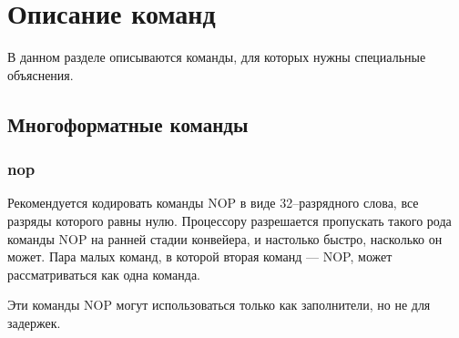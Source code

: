 \documentclass[forwardcom.tex]{subfiles}
\begin{document}
\section{Описание команд}
В данном разделе описываются команды, для которых нужны специальные объяснения.

\subsection{Многоформатные команды}
\subsubsection{nop}
Рекомендуется кодировать команды NOP в виде 32--разрядного слова, все разряды которого равны нулю. Процессору разрешается пропускать такого рода команды NOP на ранней стадии конвейера, и настолько быстро, насколько он может. Пара малых команд, в которой вторая команд --- NOP, может рассматриваться как одна команда.

Эти команды NOP могут использоваться только как заполнители, но не для задержек.
\end{document}
